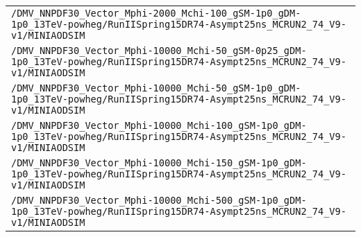 \begin{center}
\begin{tabular}{l}
\verb!/DMV_NNPDF30_Vector_Mphi-2000_Mchi-100_gSM-1p0_gDM-1p0_13TeV-powheg/RunIISpring15DR74-Asympt25ns_MCRUN2_74_V9-v1/MINIAODSIM! \tabularnewline
\verb!/DMV_NNPDF30_Vector_Mphi-10000_Mchi-50_gSM-0p25_gDM-1p0_13TeV-powheg/RunIISpring15DR74-Asympt25ns_MCRUN2_74_V9-v1/MINIAODSIM! \tabularnewline
\verb!/DMV_NNPDF30_Vector_Mphi-10000_Mchi-50_gSM-1p0_gDM-1p0_13TeV-powheg/RunIISpring15DR74-Asympt25ns_MCRUN2_74_V9-v1/MINIAODSIM! \tabularnewline
\verb!/DMV_NNPDF30_Vector_Mphi-10000_Mchi-100_gSM-1p0_gDM-1p0_13TeV-powheg/RunIISpring15DR74-Asympt25ns_MCRUN2_74_V9-v1/MINIAODSIM! \tabularnewline
\verb!/DMV_NNPDF30_Vector_Mphi-10000_Mchi-150_gSM-1p0_gDM-1p0_13TeV-powheg/RunIISpring15DR74-Asympt25ns_MCRUN2_74_V9-v1/MINIAODSIM! \tabularnewline
\verb!/DMV_NNPDF30_Vector_Mphi-10000_Mchi-500_gSM-1p0_gDM-1p0_13TeV-powheg/RunIISpring15DR74-Asympt25ns_MCRUN2_74_V9-v1/MINIAODSIM! \tabularnewline
\hline
\end{tabular}\end{center}

